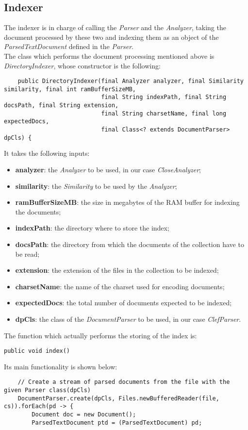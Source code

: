 \begin{itemize}
\subsection{Indexer}
The indexer is in charge of calling the \textit{Parser} and the \textit{Analyzer}, taking the document processed by these two and indexing them as an object of the \textit{ParsedTextDocument} defined in the \textit{Parser}. \\
The class which performs the document processing mentioned above is \textit{DirectoryIndexer}, whose constructor is the following:
\begin{lstlisting}
    public DirectoryIndexer(final Analyzer analyzer, final Similarity similarity, final int ramBufferSizeMB,
                            final String indexPath, final String docsPath, final String extension,
                            final String charsetName, final long expectedDocs,
                            final Class<? extends DocumentParser> dpCls) {
\end{lstlisting}
It takes the following inputs:
\begin{itemize}
\item \textbf{analyzer}: the \textit{Analyzer} to be used, in our case \textit{CloseAnalyzer};
\item \textbf{similarity}: the \textit{Similarity} to be used by the \textit{Analyzer};
\item \textbf{ramBufferSizeMB}: the size in megabytes of the RAM buffer for indexing the documents;
\item \textbf{indexPath}: the directory where to store the index;
\item \textbf{docsPath}: the directory from which the documents of the collection have to be read;
\item \textbf{extension}: the extension of the files in the collection to be indexed;
\item \textbf{charsetName}: the name of the charset used for encoding documents;
\item \textbf{expectedDocs}: the total number of documents expected to be indexed;
\item \textbf{dpCls}: the class of the \textit{DocumentParser} to be used, in our case \textit{ClefParser}.
\end{itemize}
The function which actually performs the storing of the index is:
\begin{verbatim}
public void index()
\end{verbatim}
Its main functionality is shown below:
\begin{lstlisting}
    // Create a stream of parsed documents from the file with the given Parser class(dpCls)
    DocumentParser.create(dpCls, Files.newBufferedReader(file, cs)).forEach(pd -> {
        Document doc = new Document();
        ParsedTextDocument ptd = (ParsedTextDocument) pd;


\end{lstlisting}
\end{itemize}
